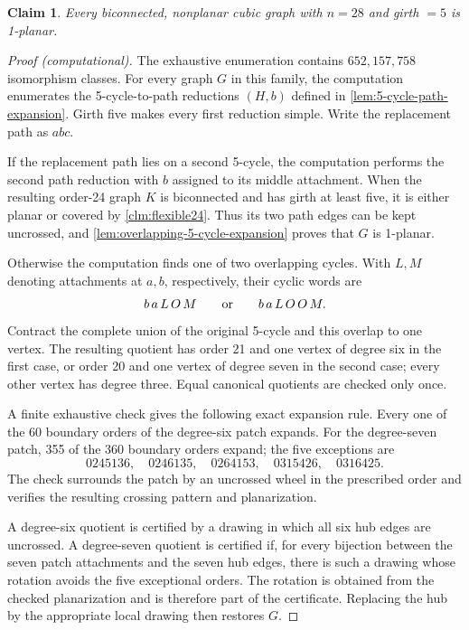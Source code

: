 \documentclass[a4paper,11pt]{article}
\theoremstyle{plain}
\newtheorem{claim}{Claim}
\theoremstyle{definition}  %
\begin{document}
\begin{claim}\label{clm:girth5-28}
    Every biconnected, nonplanar cubic graph with $n=28$ and girth $=5$ is
    1-planar.
\end{claim}

\begin{proof}[Proof (computational)]
    The exhaustive enumeration contains $652{,}157{,}758$ isomorphism
    classes.  For every graph $G$ in this family, the computation enumerates
    the 5-cycle-to-path reductions $(H,b)$ defined in
    \cref{lem:5-cycle-path-expansion}.  Girth five makes every first
    reduction simple.  Write the replacement path as $a b c$.

    If the replacement path lies on a second 5-cycle, the computation
    performs the second path reduction with $b$ assigned to its middle
    attachment.  When the resulting order-24 graph $K$ is biconnected and
    has girth at least five, it is either planar or covered by
    \cref{clm:flexible24}.  Thus its two path edges can be kept uncrossed, and
    \cref{lem:overlapping-5-cycle-expansion} proves that $G$ is 1-planar.

    Otherwise the computation finds one of two overlapping cycles.  With
    $L,M$ denoting attachments at $a,b$, respectively, their cyclic words are
    \[
        b\,a\,L\,O\,M
        \qquad\hbox{or}\qquad
        b\,a\,L\,O\,O\,M .
    \]
    Contract the complete union of the original 5-cycle and this overlap to
    one vertex.  The resulting quotient has order 21 and one vertex of
    degree six in the first case, or order 20 and one vertex of degree seven
    in the second case; every other vertex has degree three.  Equal
    canonical quotients are checked only once.

    A finite exhaustive check gives the following exact expansion rule.
    Every one of the 60 boundary orders
    of the degree-six patch expands.  For the degree-seven patch, 355 of the
    360 boundary orders expand; the five exceptions are
    \[
      0245136,\quad0246135,\quad0264153,\quad
      0315426,\quad0316425.
    \]
    The check surrounds the patch by an uncrossed wheel in the prescribed
    order and verifies the resulting crossing pattern and planarization.

    A degree-six quotient is certified by a drawing in which all six hub
    edges are uncrossed.  A degree-seven quotient is certified if, for every
    bijection between the seven patch attachments and the seven hub edges,
    there is such a drawing whose rotation avoids the five exceptional
    orders.  The rotation is obtained from the checked planarization and is
    therefore part of the certificate.  Replacing the hub by the appropriate
    local drawing then restores $G$.


\end{proof}
\end{document}
